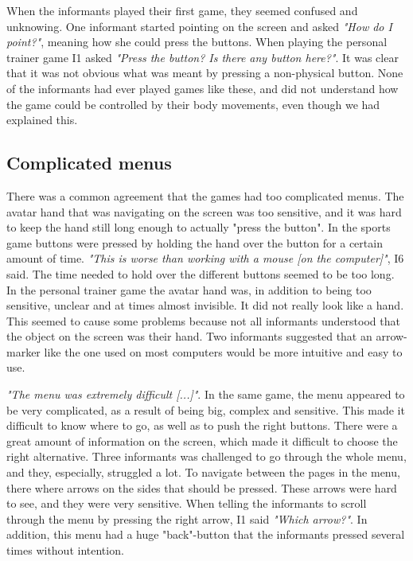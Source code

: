 When the informants played their first game, they seemed confused and unknowing. One informant started pointing on the screen and asked \emph{"How do I point?"}, meaning how she could press the buttons. When playing the personal trainer game I1 asked \emph{"Press the button? Is there any button here?"}. It was clear that it was not obvious what was meant by pressing a non-physical button. None of the informants had ever played games like these, and did not understand how the game could be controlled by their body movements, even though we had explained this. 

\subsection{Complicated menus}
There was a common agreement that the games had too complicated menus.  The avatar hand that was navigating on the screen was too sensitive, and it was hard to keep the hand still long enough to actually "press the button". In the sports game buttons were pressed by holding the hand over the button for a certain amount of time. \emph{"This is worse than working with a mouse [on the computer]"}, I6 said. The time needed to hold over the different buttons seemed to be too long. In the personal trainer game the avatar hand was, in addition to being too sensitive, unclear and at times almost invisible. It did not really look like a hand. This seemed to cause some problems because not all informants understood that the object on the screen was their hand. Two informants suggested that an arrow-marker like the one used on most computers would be more intuitive and easy to use. 

\emph{"The menu was extremely difficult [...]"}. In the same game, the menu appeared to be very complicated, as a result of being big, complex and sensitive. This made it difficult to know where to go, as well as to push the right buttons. There were a great amount of information on the screen, which made it difficult to choose the right alternative. Three informants was challenged to go through the whole menu, and they, especially, struggled a lot. To navigate between the pages in the menu, there where arrows on the sides that should be pressed. These arrows were hard to see, and they were very sensitive. When telling the informants to scroll through the menu by pressing the right arrow, I1 said \emph{"Which arrow?"}. In addition, this menu had a huge "back"-button that the informants pressed several times without intention. 

